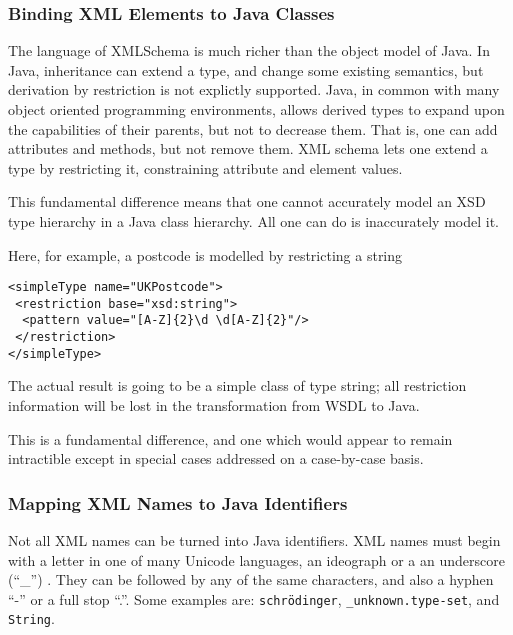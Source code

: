 \subsubsection{Binding XML Elements to Java Classes}
\label{objections:o-x:xml-classes}

The language of XMLSchema is much richer than the object model of
Java. In Java, inheritance can extend a type, and change some existing
semantics, but derivation by restriction is not explictly
supported. Java, in common with many object oriented programming
environments, allows derived types to expand upon the capabilities of
their parents, but not to decrease them. That is, one can add attributes and
methods, but not remove them. XML schema lets one extend a type by 
restricting it, constraining attribute and element values.

This fundamental difference means that one cannot accurately model an
XSD type hierarchy in a Java class hierarchy. All one can do is inaccurately
model it. 

Here, for example, a postcode is modelled by restricting a string



\begin{verbatim}
<simpleType name="UKPostcode">
 <restriction base="xsd:string">
  <pattern value="[A-Z]{2}\d \d[A-Z]{2}"/>
 </restriction>
</simpleType>
\end{verbatim}

The actual result is going to be a simple class of type string; all restriction information
will be lost in the transformation from WSDL to Java. 

This is a fundamental difference, and one which would appear to remain
intractible except in special cases addressed on a case-by-case
basis.

\subsubsection{Mapping XML Names to Java Identifiers}
\label{objections:o-x:names}


Not all XML names can be turned into Java identifiers. 
XML names must begin with a letter in one of many Unicode languages,
an ideograph or a an underscore (``\_'') . They can be followed by any of the same
characters, and also a hyphen ``-'' or a full stop ``.''. Some examples
are: {\tt schr\"odinger}, {\tt \_unknown.type-set}, and {\tt String}.


